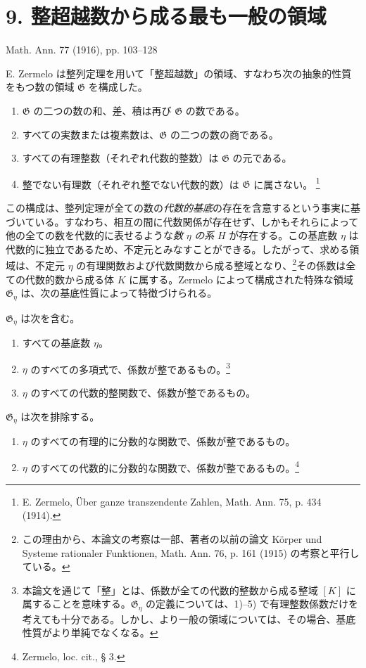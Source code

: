 \documentclass[11pt]{article}
\begin{document}
\clearpage
\section*{9. 整超越数から成る最も一般の領域}
\begin{center}
Math. Ann. 77 (1916), pp. 103--128
\end{center}

E. Zermelo は整列定理を用いて「整超越数」の領域、すなわち次の抽象的性質をもつ数の領域 $\mathfrak G$ を構成した。
\begin{enumerate}
\item[I.] $\mathfrak G$ の二つの数の和、差、積は再び $\mathfrak G$ の数である。
\item[II.] すべての実数または複素数は、$\mathfrak G$ の二つの数の商である。
\item[III.] すべての有理整数（それぞれ代数的整数）は $\mathfrak G$ の元である。
\item[IV.] 整でない有理数（それぞれ整でない代数的数）は $\mathfrak G$ に属さない。
\footnote{E. Zermelo, Über ganze transzendente Zahlen, Math. Ann. 75, p. 434 (1914).}
\end{enumerate}

この構成は、整列定理が全ての数の\emph{代数的基底}の存在を含意するという事実に基づいている。すなわち、相互の間に代数関係が存在せず、しかもそれらによって他の全ての数を代数的に表せるような\emph{数} $\eta$ \emph{の系} $H$ が存在する。この基底数 $\eta$ は代数的に独立であるため、不定元とみなすことができる。したがって、求める領域は、不定元 $\eta$ の有理関数および代数関数から成る整域となり、\footnote{この理由から、本論文の考察は一部、著者の以前の論文 Körper und Systeme rationaler Funktionen, Math. Ann. 76, p. 161 (1915) の考察と平行している。}その係数は全ての代数的数から成る体 $K$ に属する。Zermelo によって構成された特殊な領域 $\mathfrak G_\eta$ は、次の基底性質によって特徴づけられる。

$\mathfrak G_\eta$ は次を含む。
\begin{enumerate}
\item[1)] すべての基底数 $\eta$。
\item[2)] $\eta$ のすべての多項式で、係数が整であるもの。\footnote{本論文を通じて「整」とは、係数が全ての代数的整数から成る整域 $[K]$ に属することを意味する。$\mathfrak G_\eta$ の定義については、1)--5) で有理整数係数だけを考えても十分である。しかし、より一般の領域については、その場合、基底性質がより単純でなくなる。}
\item[3)] $\eta$ のすべての代数的整関数で、係数が整であるもの。
\end{enumerate}
$\mathfrak G_\eta$ は次を排除する。
\begin{enumerate}
\item[4)] $\eta$ のすべての有理的に分数的な関数で、係数が整であるもの。
\item[5)] $\eta$ のすべての代数的に分数的な関数で、係数が整であるもの。\footnote{Zermelo, loc. cit., § 3.}
\end{enumerate}
\end{document}
